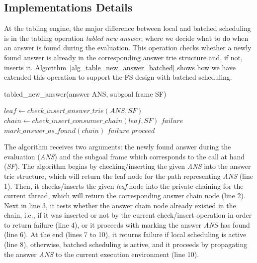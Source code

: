 \documentclass{llncs}
\begin{document}

\subsection{Implementations Details}

At the tabling engine, the major difference between local and batched
scheduling is in the tabling operation \emph{tabled new answer}, where
we decide what to do when an answer is found during the
evaluation. This operation checks whether a newly found answer is
already in the corresponding answer trie structure and, if not,
inserts it. Algorithm~\ref{alg_table_new_answer_batched} shows how we
have extended this operation to support the FS design with batched
scheduling.

\begin{algorithm} [!ht]
\caption{tabled\_new\_answer(answer ANS, subgoal frame SF)}
\begin{algorithmic}[1]
  \STATE $leaf \gets check\_insert\_answer\_trie(ANS, SF)$
  \STATE $chain \gets check\_insert\_consumer\_chain(leaf, SF)$
    \RETURN $failure$
    \STATE $mark\_answer\_as\_found(chain)$
      \RETURN $failure$
      \RETURN $proceed$
    \ENDIF
  \ENDIF  
\end{algorithmic}
\label{alg_table_new_answer_batched}
\end{algorithm}

The algorithm receives two arguments: the newly found answer during
the evaluation (\emph{ANS}) and the subgoal frame which corresponds to
the call at hand (\emph{SF}). The algorithm begins by
checking/inserting the given \emph{ANS} into the answer trie
structure, which will return the leaf node for the path representing
\emph{ANS} (line 1). Then, it checks/inserts the given \emph{leaf}
node into the private chaining for the current thread, which will
return the corresponding answer chain node (line 2). Next in line 3,
it tests whether the answer chain node already existed in the chain,
i.e., if it was inserted or not by the current check/insert operation
in order to return failure (line 4), or it proceeds with marking the
answer \emph{ANS} has found (line 6). At the end (lines 7 to 10), it
returns failure if local scheduling is active (line 8), otherwise,
batched scheduling is active, and it proceeds by propagating the
answer \emph{ANS} to the current execution environment (line 10).
\end{document}
